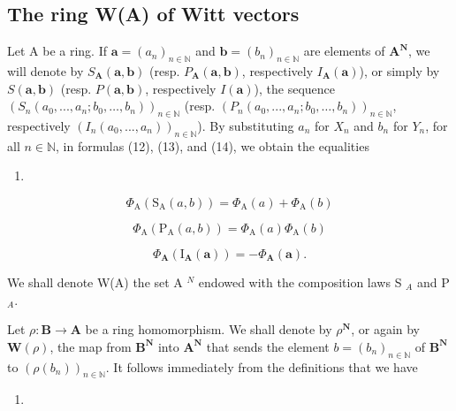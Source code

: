 \subsection{The ring W(A) of Witt vectors}

Let A be a ring. If \(\boldsymbol{a} = (a_n)_{n \in \mathbb{N}}\) and \(\boldsymbol{b} = (b_n)_{n \in \mathbb{N}}\) are elements of \(\mathbf{A}^{\mathbf{N}}\), we will denote by \(S_{\mathbf{A}}(\boldsymbol{a}, \boldsymbol{b})\) (resp. \(P_{\mathbf{A}}(\boldsymbol{a}, \boldsymbol{b})\), respectively \(I_{\mathbf{A}}(\boldsymbol{a})\)), or simply by \(S(\boldsymbol{a}, \boldsymbol{b})\) (resp. \(P(\boldsymbol{a}, \boldsymbol{b})\), respectively \(I(\boldsymbol{a})\)), the sequence \((S_n(a_0, ..., a_n; b_0, \ldots, b_n))_{n \in \mathbb{N}}\) (resp. \((P_n(a_0, ..., a_n; b_0, \ldots, b_n))_{n \in \mathbb{N}}\), respectively \((I_n(a_0, ..., a_n))_{n \in \mathbb{N}}\)). By substituting \(a_n\) for \(X_n\) and \(b_n\) for \(Y_n\), for all \(n \in \mathbb{N}\), in formulas (12), (13), and (14), we obtain the equalities

\begin{enumerate}
\def\labelenumi{(\arabic{enumi})}
\setcounter{enumi}{15}
\tightlist
\item
\end{enumerate}

\[
\Phi_ {\mathrm{A}} (\mathrm{S} _ {\mathrm{A}} (a, b)) = \Phi_ {\mathrm{A}} (a) + \Phi_ {\mathrm{A}} (b)\tag{17}
\]

\[
\Phi_ {\mathrm{A}} (\mathrm{P} _ {\mathrm{A}} (a, b)) = \Phi_ {\mathrm{A}} (a) \Phi_ {\mathrm{A}} (b)\tag{18}
\]

\[
\Phi_ {\mathbf {A}} \left(\mathrm{I} _ {\mathbf {A}} (\boldsymbol {a})\right) = - \Phi_ {\mathbf {A}} (\boldsymbol {a}).
\]

We shall denote W(A) the set A \(^{N}\) endowed with the composition laws S \(_{A}\) and P \(_{A}\).

Let \(\rho : \mathbf{B} \to \mathbf{A}\) be a ring homomorphism. We shall denote by \(\rho^{\mathbf{N}}\), or again by \(\mathbf{W}(\rho)\), the map from \(\mathbf{B}^{\mathbf{N}}\) into \(\mathbf{A}^{\mathbf{N}}\) that sends the element \(b = (b_n)_{n \in \mathbb{N}}\) of \(\mathbf{B}^{\mathbf{N}}\) to \((\rho(b_n))_{n \in \mathbb{N}}\). It follows immediately from the definitions that we have

\begin{enumerate}
\def\labelenumi{(\arabic{enumi})}
\setcounter{enumi}{18}
\tightlist
\item
\end{enumerate}

